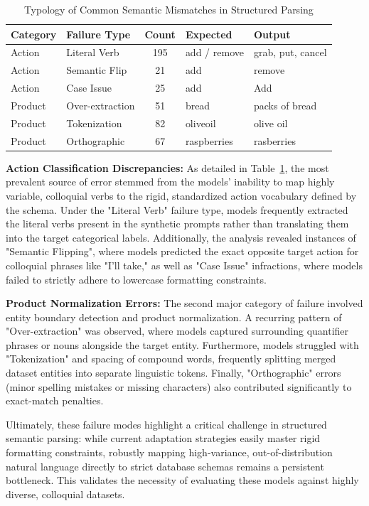 \documentclass[journal,article,submit,pdftex,moreauthors]{Definitions/mdpi}
\begin{document}
\begin{table}[H]
\caption{Typology of Common Semantic Mismatches in Structured Parsing}\label{tab:error_typology}
\renewcommand{\arraystretch}{1.3}
\begin{tabular}{l l c l l}
\toprule
\textbf{Category} & \textbf{Failure Type} & \textbf{Count} & \textbf{Expected} & \textbf{Output} \\
\midrule
Action & Literal Verb & 195 & add / remove & grab, put, cancel \\
Action & Semantic Flip & 21 & add & remove \\
Action & Case Issue & 25 & add & Add \\
\midrule
Product & Over-extraction& 51 & bread & packs of bread \\
Product & Tokenization & 82 & oliveoil & olive oil \\
Product & Orthographic & 67 & raspberries & rasberries \\
\bottomrule
\end{tabular}
\end{table}

\textbf{Action Classification Discrepancies:} As detailed in Table~\ref{tab:error_typology}, the most prevalent source of error stemmed from the models' inability to map highly variable, colloquial verbs to the rigid, standardized action vocabulary defined by the schema. Under the "Literal Verb" failure type, models frequently extracted the literal verbs present in the synthetic prompts rather than translating them into the target categorical labels. Additionally, the analysis revealed instances of "Semantic Flipping", where models predicted the exact opposite target action for colloquial phrases like "I'll take," as well as "Case Issue" infractions, where models failed to strictly adhere to lowercase formatting constraints.

\textbf{Product Normalization Errors:} The second major category of failure involved entity boundary detection and product normalization. A recurring pattern of "Over-extraction" was observed, where models captured surrounding quantifier phrases or nouns alongside the target entity. Furthermore, models struggled with "Tokenization" and spacing of compound words, frequently splitting merged dataset entities into separate linguistic tokens. Finally, "Orthographic" errors (minor spelling mistakes or missing characters) also contributed significantly to exact-match penalties.

Ultimately, these failure modes highlight a critical challenge in structured semantic parsing: while current adaptation strategies easily master rigid formatting constraints, robustly mapping high-variance, out-of-distribution natural language directly to strict database schemas remains a persistent bottleneck. This validates the necessity of evaluating these models against highly diverse, colloquial datasets.
\end{document}
